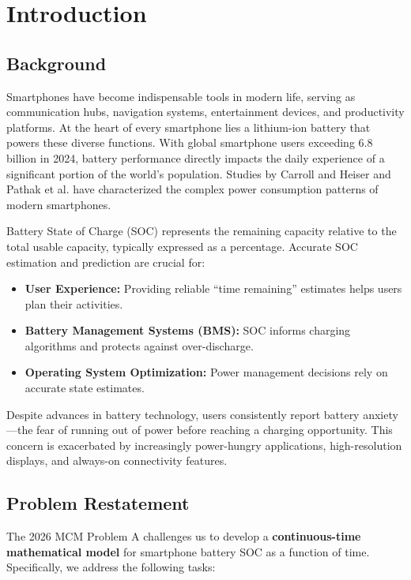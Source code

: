 \section{Introduction}
\label{sec:introduction}

\subsection{Background}
\label{subsec:background}

Smartphones have become indispensable tools in modern life, serving as communication hubs, navigation systems, entertainment devices, and productivity platforms. At the heart of every smartphone lies a lithium-ion battery that powers these diverse functions. With global smartphone users exceeding 6.8 billion in 2024, battery performance directly impacts the daily experience of a significant portion of the world's population. Studies by Carroll and Heiser \cite{Carroll2010} and Pathak et al. \cite{Pathak2012} have characterized the complex power consumption patterns of modern smartphones.

Battery State of Charge (SOC) represents the remaining capacity relative to the total usable capacity, typically expressed as a percentage. Accurate SOC estimation and prediction are crucial for:
\begin{itemize}
    \item \textbf{User Experience:} Providing reliable ``time remaining'' estimates helps users plan their activities.
    \item \textbf{Battery Management Systems (BMS):} SOC informs charging algorithms and protects against over-discharge.
    \item \textbf{Operating System Optimization:} Power management decisions rely on accurate state estimates.
\end{itemize}

Despite advances in battery technology, users consistently report battery anxiety---the fear of running out of power before reaching a charging opportunity. This concern is exacerbated by increasingly power-hungry applications, high-resolution displays, and always-on connectivity features.

\subsection{Problem Restatement}
\label{subsec:problem}

The 2026 MCM Problem A challenges us to develop a \textbf{continuous-time mathematical model} for smartphone battery SOC as a function of time. Specifically, we address the following tasks:


